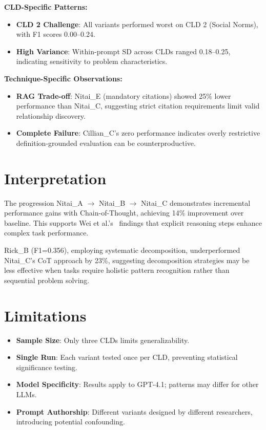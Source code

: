 \textbf{CLD-Specific Patterns:}
\begin{itemize}[noitemsep]
    \item \textbf{CLD 2 Challenge}: All variants performed worst on CLD 2 (Social Norms), with F1 scores 0.00--0.24.
    \item \textbf{High Variance}: Within-prompt SD across CLDs ranged 0.18--0.25, indicating sensitivity to problem characteristics.
\end{itemize}

\textbf{Technique-Specific Observations:}
\begin{itemize}[noitemsep]
    \item \textbf{RAG Trade-off}: Nitai\_E (mandatory citations) showed 25\% lower performance than Nitai\_C, suggesting strict citation requirements limit valid relationship discovery.
    \item \textbf{Complete Failure}: Cillian\_C's zero performance indicates overly restrictive definition-grounded evaluation can be counterproductive.
\end{itemize}

\section{Interpretation}

The progression Nitai\_A $\rightarrow$ Nitai\_B $\rightarrow$ Nitai\_C demonstrates incremental performance gains with Chain-of-Thought, achieving 14\% improvement over baseline. This supports Wei et al.'s~\cite{wei2022chain} findings that explicit reasoning steps enhance complex task performance.

Rick\_B (F1=0.356), employing systematic decomposition, underperformed Nitai\_C's CoT approach by 23\%, suggesting decomposition strategies may be less effective when tasks require holistic pattern recognition rather than sequential problem solving.

\section{Limitations}

\begin{itemize}[noitemsep]
    \item \textbf{Sample Size}: Only three CLDs limits generalizability.
    \item \textbf{Single Run}: Each variant tested once per CLD, preventing statistical significance testing.
    \item \textbf{Model Specificity}: Results apply to GPT-4.1; patterns may differ for other LLMs.
    \item \textbf{Prompt Authorship}: Different variants designed by different researchers, introducing potential confounding.
\end{itemize}


